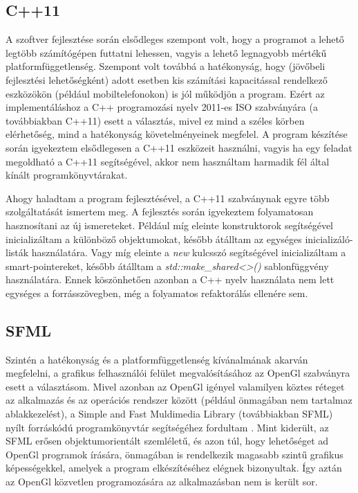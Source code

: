 \documentclass[12pt, twoside]{report}
\begin{document}
\subsection{C++11}

A szoftver fejlesztése során elsődleges szempont volt, hogy a programot a lehető legtöbb számítógépen futtatni lehessen, vagyis a lehető legnagyobb mértékű platformfüggetlenség. Szempont volt továbbá a hatékonyság, hogy (jövőbeli fejlesztési lehetőségként) adott esetben kis számítási kapacitással rendelkező eszközökön (például mobiltelefonokon) is jól működjön a program. Ezért az implementáláshoz a C++ programozási nyelv 2011-es ISO szabványára (a továbbiakban C++11) esett a választás, mivel ez mind a széles körben elérhetőség, mind a hatékonyság követelményeinek megfelel. A program készítése során igyekeztem elsődlegesen a C++11 eszközeit használni, vagyis ha egy feladat megoldható a C++11 segítségével, akkor nem használtam harmadik fél által kínált programkönyvtárakat.

Ahogy haladtam a program fejlesztésével, a C++11 szabványnak egyre több szol\-gál\-ta\-tá\-sát ismertem meg. A fejlesztés során igyekeztem folyamatosan hasznosítani az új ismereteket. Például míg eleinte konstruktorok segítségével inicializáltam a különböző objektumokat, később átálltam az egységes inicializáló-listák használatára. Vagy míg eleinte a \emph{new} kulcsszó segítségével inicializáltam a smart-pointereket, később átálltam a \emph{std::make\_shared\textless\textgreater()} sablonfüggvény használatára. Ennek köszönhetően azonban a C++ nyelv használata nem lett egységes a forrásszövegben, még a folyamatos refaktorálás ellenére sem.

\subsection{SFML}

Szintén a hatékonyság és a platformfüggetlenség kívánalmának akarván megfelelni, a grafikus felhasználói felület megvalósításához az OpenGl szabványra esett a választásom. Mivel azonban az OpenGl igényel valamilyen köztes réteget az alkalmazás és az operációs rendszer között (például önmagában nem tartalmaz ablakkezelést), a Simple and Fast Muldimedia Library (továbbiakban SFML) nyílt forráskódú programkönyvtár se\-gít\-sé\-gé\-hez fordultam \cite{sfml}. Mint kiderült, az SFML erősen objektumorientált szemléletű, és azon túl, hogy lehetőséget ad OpenGl programok írására, önmagában is rendelkezik magasabb szintű grafikus képességekkel, amelyek a program elkészítéséhez elégnek bizonyultak. Így aztán az OpenGl közvetlen programozására az alkalmazásban nem is került sor. 
\end{document}

